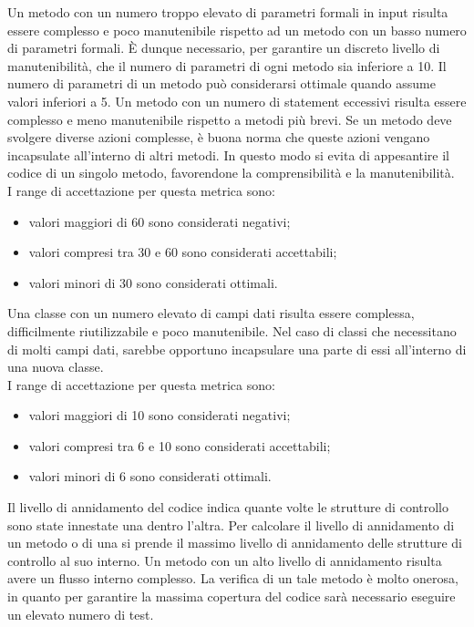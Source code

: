 			Un metodo con un numero troppo elevato di parametri formali in input risulta essere complesso e poco manutenibile rispetto ad un metodo con un basso numero di parametri formali. È dunque necessario, per garantire un discreto livello di manutenibilità, che il numero di parametri di ogni metodo sia inferiore a 10. Il numero di parametri di un metodo può considerarsi ottimale quando assume valori inferiori a 5.
			Un metodo con un numero di statement eccessivi risulta essere complesso e meno manutenibile rispetto a metodi più brevi. Se un metodo deve svolgere diverse azioni complesse, è buona norma che queste azioni vengano incapsulate all'interno di altri metodi. In questo modo si evita di appesantire il codice di un singolo metodo, favorendone la comprensibilità e la manutenibilità.\\
			I range di accettazione per questa metrica sono:
				\begin{itemize}
					\item valori maggiori di 60 sono considerati negativi;
					\item valori compresi tra 30 e 60 sono considerati accettabili;
					\item valori minori di 30 sono considerati ottimali.
				\end{itemize}
			Una classe con un numero elevato di campi dati risulta essere complessa, difficilmente riutilizzabile e poco manutenibile. Nel caso di classi che necessitano di molti campi dati, sarebbe opportuno incapsulare una parte di essi all'interno di una nuova classe.\\
			I range di accettazione per questa metrica sono:
				\begin{itemize}
					\item valori maggiori di 10 sono considerati negativi;
					\item valori compresi tra 6 e 10 sono considerati accettabili;
					\item valori minori di 6 sono considerati ottimali.
				\end{itemize}
			Il livello di annidamento del codice indica quante volte le strutture di controllo sono state innestate una dentro l'altra. Per calcolare il livello di annidamento di un metodo o di una  si prende il massimo livello di annidamento delle strutture di controllo al suo interno. Un metodo con un alto livello di annidamento risulta avere un flusso interno complesso. La verifica di un tale metodo è molto onerosa, in quanto per garantire la massima copertura del codice sarà necessario eseguire un elevato numero di test.\\
